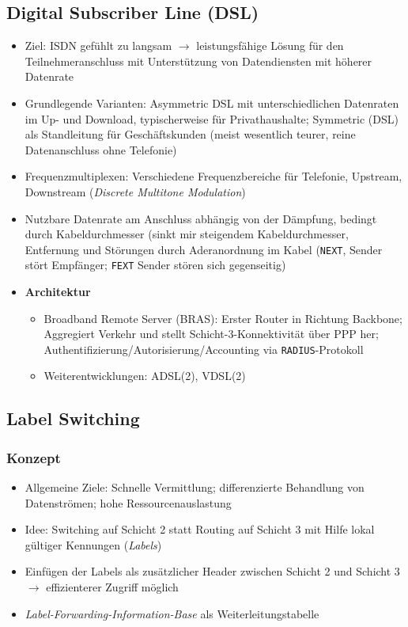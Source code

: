 \subsection{Digital Subscriber Line (DSL)}
\begin{itemize}
	\item Ziel: ISDN gefühlt zu langsam \(\rightarrow\) leistungsfähige Lösung für den Teilnehmeranschluss mit Unterstützung von Datendiensten mit höherer Datenrate
	\item Grundlegende Varianten: Asymmetric DSL mit unterschiedlichen Datenraten im Up- und Download, typischerweise für Privathaushalte; Symmetric (DSL) als Standleitung für Geschäftskunden (meist wesentlich teurer, reine Datenanschluss ohne Telefonie)
	\item Frequenzmultiplexen: Verschiedene Frequenzbereiche für Telefonie, Upstream, Downstream (\textit{Discrete Multitone Modulation})
	\item Nutzbare Datenrate am Anschluss abhängig von der Dämpfung, bedingt durch Kabeldurchmesser (sinkt mir steigendem Kabeldurchmesser, Entfernung und Störungen durch Aderanordnung im Kabel (\texttt{NEXT}, Sender stört Empfänger; \texttt{FEXT} Sender stören sich gegenseitig)
	\item \textbf{Architektur}
	\begin{itemize}
		\item Broadband Remote Server (BRAS): Erster Router in Richtung Backbone; Aggregiert Verkehr und stellt Schicht-3-Konnektivität über PPP her; Authentifizierung/Autorisierung/Accounting via \texttt{RADIUS}-Protokoll
		\item Weiterentwicklungen: ADSL(2), VDSL(2)
	\end{itemize}
\end{itemize}


\subsection{Label Switching}

\subsubsection{Konzept}
\begin{itemize}
	\item Allgemeine Ziele: Schnelle Vermittlung; differenzierte Behandlung von Datenströmen; hohe Ressourcenauslastung
	\item Idee: Switching auf Schicht 2 statt Routing auf Schicht 3 mit Hilfe lokal gültiger Kennungen (\textit{Labels})
	\item Einfügen der Labels als zusätzlicher Header zwischen Schicht 2 und Schicht 3 \(\rightarrow\) effizienterer Zugriff möglich
	\item \textit{Label-Forwarding-Information-Base} als Weiterleitungstabelle
\end{itemize}

